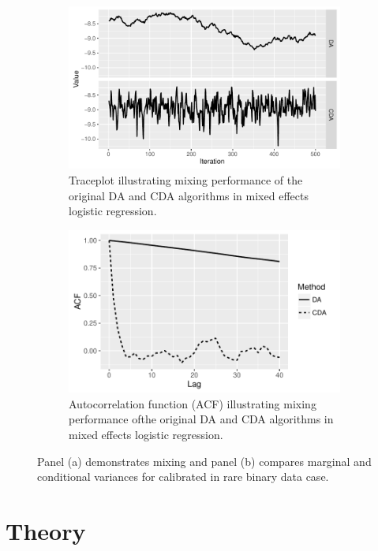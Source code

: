 \documentclass[10pt]{article}
\begin{document}
\begin{figure}[H]
  \begin{subfigure}[b]{0.49\textwidth}
 \includegraphics[width=1\textwidth]{logit_random_trace_plot.pdf}
  \caption{Traceplot illustrating mixing performance of the original DA and CDA algorithms in mixed effects logistic regression.}
\end{subfigure}
  \hfill
   \begin{subfigure}[b]{0.49\textwidth}
 \includegraphics[width=1\textwidth]{logit_random_acf.pdf}
  \caption{Autocorrelation function (ACF) illustrating mixing performance ofthe original DA and CDA algorithms in mixed effects logistic regression.}
\end{subfigure}
 \caption{Panel (a) demonstrates mixing and panel (b) compares marginal and conditional variances for calibrated  \cite{albert1993bayesian} in rare binary data case.}
    \label{logit_random_mixing}
 \end{figure}
 
\section{Theory}
\end{document}

